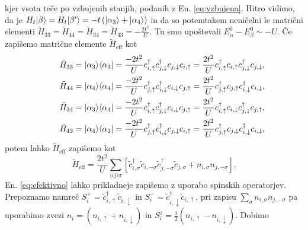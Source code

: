 \begin{appendices}
\begin{equation}
\end{equation}
kjer vsota teče po vzbujenih stanjih, podanih z En. \eqref{eq:vzbujena}. Hitro vidimo, da je 
$H_t\vert\beta\rangle=H_t\vert\beta'\rangle=-t\left(\vert\alpha_3\rangle+ \vert\alpha_4\rangle\right)$ in da so potemtakem neničelni le matrični elementi $\tilde{H}_{33}=\tilde{H}_{44}=\tilde{H}_{34}=\tilde{H}_{43}=-\frac{2t^2}{U}$. Tu smo upoštevali $E_\alpha^0- E_\beta^0 \sim -U$. Če zapišemo matrične elemente $\tilde{H}_\mathrm{eff}$ kot
\begin{equation}
\begin{aligned}\qquad
&\tilde{H}_{33}=\vert\alpha_3\rangle\langle \alpha_3 \vert=\frac{-2t^2}{U} c^\dagger_{i,\uparrow}c^\dagger_{j,\downarrow}c_{j,\downarrow}c_{i,\uparrow}= \frac{2t^2}{U}c^\dagger_{i,\uparrow}c_{i,\uparrow}c^\dagger_{j,\downarrow}c_{j,\downarrow},\\
&\tilde{H}_{44}=\vert\alpha_4\rangle\langle \alpha_4 \vert=\frac{-2t^2}{U} c^\dagger_{j,\uparrow}c^\dagger_{i,\downarrow}c_{i,\downarrow}c_{j,\uparrow}= \frac{2t^2}{U}c^\dagger_{j,\uparrow}c_{j,\uparrow}c^\dagger_{i,\downarrow}c_{i,\downarrow},\\
&\tilde{H}_{34}=\vert\alpha_3\rangle\langle \alpha_4 \vert=\frac{-2t^2}{U} c^\dagger_{i,\uparrow}c^\dagger_{j,\downarrow}c_{i,\downarrow}c_{j,\uparrow}= \frac{2t^2}{U}c^\dagger_{i,\uparrow}c_{i,\downarrow}c^\dagger_{j,\downarrow}c_{j,\uparrow},\\
&\tilde{H}_{43}=\vert\alpha_4\rangle\langle \alpha_3 \vert=\frac{-2t^2}{U} c^\dagger_{j,\uparrow}c^\dagger_{i,\downarrow}c_{j,\downarrow}c_{i,\uparrow}= \frac{2t^2}{U}c^\dagger_{j,\uparrow}c_{j,\downarrow}c^\dagger_{i,\downarrow}c_{i,\downarrow},
\end{aligned}
\end{equation}
potem lahko  $\tilde{H}_\mathrm{eff}$ zapišemo kot 
\begin{equation}\label{eq:efektivno}
\tilde{H}_\mathrm{eff} = \frac{2t^2}{U}\sum\limits_{\langle ij\rangle \sigma } \left[\tilde{c}^\dagger_{i,\sigma}\tilde{c}_{i,-\sigma}\tilde{c}^\dagger_{j,-\sigma}\tilde{c}_{j,\sigma} + n_{i,\sigma}n_{j,-\sigma}  \right].
\end{equation}
En. \eqref{eq:efektivno} lahko prikladneje zapišemo z uporabo spinskih operatorjev. Prepoznamo namreč $S_i^+=\tilde{c}^\dagger_{i,\uparrow}\tilde{c}_{i,\downarrow}$ in $S_i^-=\tilde{c}^\dagger_{i,\downarrow}\tilde{c}_{i,\uparrow}$, pri zapisu $\sum\limits_{\sigma} n_{i,\sigma}n_{j,-\sigma}$ pa uporabimo zvezi $n_i=\left( n_{i,\uparrow} + n_{i, \downarrow}\right)$ in $S_i^z=\frac{1}{2}\left(n_{i, \uparrow} - n_{i, \downarrow} \right)$. Dobimo

\end{appendices}
